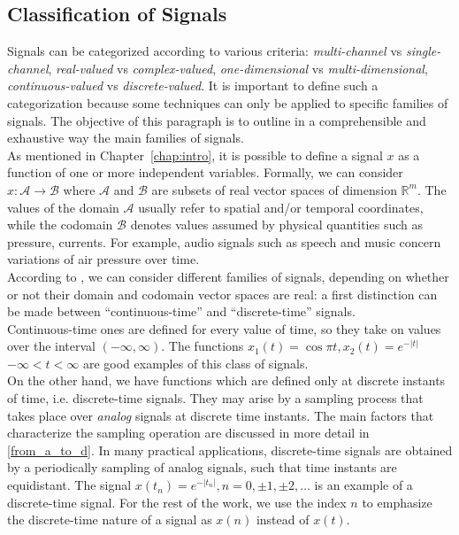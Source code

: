\subsection{Classification of Signals}
Signals can be categorized according to various criteria: \textit{multi-channel} vs \textit{single-channel}, \textit{real-valued} vs \textit{complex-valued}, \textit{one-dimensional} vs \textit{multi-dimensional}, \textit{continuous-valued} vs \textit{discrete-valued}. It is important to define such a categorization because some techniques can only be applied to specific families of signals. The objective of this paragraph is to outline in a comprehensible and exhaustive way the main families of signals. \\
As mentioned in Chapter~\ref{chap:intro}, it is possible to define a signal $x$ as a function of one or more independent variables. Formally, we can consider $x:\mathcal{A} \rightarrow \mathcal{B}$ where $\mathcal{A}$ and $\mathcal{B}$ are subsets of real vector spaces of dimension $\mathbb{R}^m$. The values of the domain $\mathcal{A}$ usually refer to spatial and/or temporal coordinates, while the codomain $\mathcal{B}$ denotes values assumed by physical quantities such as pressure, currents. For example, audio signals such as speech and music concern variations of air pressure over time. \\
According to \cite{proakis2006dimitris}, we can consider different families of signals, depending on whether or not their domain and codomain vector spaces are real: a first distinction can be made between “continuous-time” and “discrete-time” signals. \\
Continuous-time ones are defined for every value of time, so they take on values over the interval $(-\infty, \infty)$. The functions $x_{1}(t)=\cos \pi t, x_{2}(t)=e^{-|t|}$ $-\infty<t<\infty$ are good examples of this class of signals. \\
On the other hand, we have functions which are defined only at discrete instants of time, i.e. discrete-time signals. They may arise by a sampling process that takes place over \textit{analog} signals at discrete time instants. The main factors that characterize the sampling operation are discussed in more detail in \ref{from_a_to_d}. In many practical applications, discrete-time signals are obtained by a periodically sampling of analog signals, such that time instants are equidistant. The signal $x\left(t_{n}\right)=e^{-\left|t_{n}\right|}, n=0,\pm 1,\pm 2, \ldots$ is an example of a discrete-time signal. For the rest of the work, we use the index $n$ to emphasize the discrete-time nature of a signal as $x(n)$ instead of $x(t)$. \\
